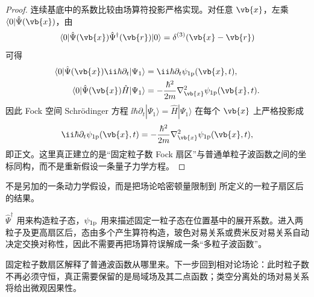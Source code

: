 \begin{proof}
连续基底中的系数比较由场算符投影严格实现。对任意 \(\vb{x}\)，左乘 \(\langle0|\hat\Psi(\vb{x})\)，由
\begin{equation*}
\langle0|\hat\Psi(\vb{x})
\hat\Psi^\dagger(\vb{r})|0\rangle
=\delta^{(3)}(\vb{x}-\vb{r})
\end{equation*}
可得
\begin{align*}
\langle0|\hat\Psi(\vb{x})
\ii\hbar\partial_t|\Psi_1\rangle
&=\ii\hbar\partial_t\psi_{\rm 1p}(\vb{x},t),\\
\langle0|\hat\Psi(\vb{x})
\hat H|\Psi_1\rangle
&=-\frac{\hbar^2}{2m}\nabla_{\vb{x}}^2
\psi_{\rm 1p}(\vb{x},t).
\end{align*}
因此 Fock 空间 Schr\"odinger 方程 \(\ii\hbar\partial_t|\Psi_1\rangle=\hat H|\Psi_1\rangle\) 在每个 \(\vb{x}\) 上严格投影成
\begin{equation*}
\ii\hbar\partial_t\psi_{\rm 1p}(\vb{x},t)
=-\frac{\hbar^2}{2m}\nabla_{\vb{x}}^2\psi_{\rm 1p}(\vb{x},t),
\end{equation*}
即正文。这里真正建立的是“固定粒子数 Fock 扇区”与普通单粒子波函数之间的坐标同构，而不是重新假设一条量子力学方程。
\end{proof}

 不是另加的一条动力学假设，而是把场论哈密顿量限制到 所定义的一粒子扇区后的结果。

$\hat\Psi^\dagger$ 用来构造粒子态，$\psi_{\rm 1p}$ 用来描述固定一粒子态在位置基中的展开系数。进入两粒子及更高扇区后，态由多个产生算符构造，玻色对易关系或费米反对易关系自动决定交换对称性，因此不需要再把场算符误解成一条“多粒子波函数”。


固定粒子数扇区解释了普通波函数从哪里来。下一步回到相对论场论：此时粒子数不再必须守恒，真正需要保留的是局域场及其二点函数；类空分离处的场对易关系将给出微观因果性。

